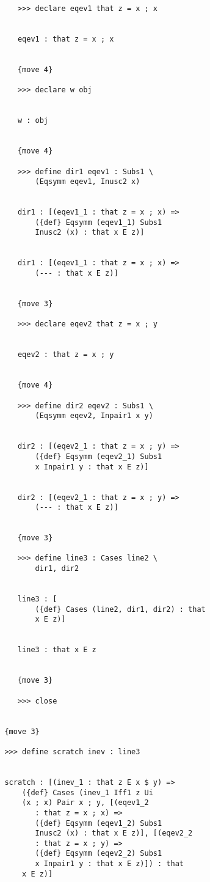 \documentclass[12pt]{article}
\begin{document}
\begin{verbatim}
            >>> declare eqev1 that z = x ; x


            eqev1 : that z = x ; x


            {move 4}

            >>> declare w obj


            w : obj


            {move 4}

            >>> define dir1 eqev1 : Subs1 \
                (Eqsymm eqev1, Inusc2 x)


            dir1 : [(eqev1_1 : that z = x ; x) => 
                ({def} Eqsymm (eqev1_1) Subs1 
                Inusc2 (x) : that x E z)]


            dir1 : [(eqev1_1 : that z = x ; x) => 
                (--- : that x E z)]


            {move 3}

            >>> declare eqev2 that z = x ; y


            eqev2 : that z = x ; y


            {move 4}

            >>> define dir2 eqev2 : Subs1 \
                (Eqsymm eqev2, Inpair1 x y)


            dir2 : [(eqev2_1 : that z = x ; y) => 
                ({def} Eqsymm (eqev2_1) Subs1 
                x Inpair1 y : that x E z)]


            dir2 : [(eqev2_1 : that z = x ; y) => 
                (--- : that x E z)]


            {move 3}

            >>> define line3 : Cases line2 \
                dir1, dir2


            line3 : [
                ({def} Cases (line2, dir1, dir2) : that 
                x E z)]


            line3 : that x E z


            {move 3}

            >>> close


         {move 3}

         >>> define scratch inev : line3


         scratch : [(inev_1 : that z E x $ y) => 
             ({def} Cases (inev_1 Iff1 z Ui 
             (x ; x) Pair x ; y, [(eqev1_2 
                : that z = x ; x) => 
                ({def} Eqsymm (eqev1_2) Subs1 
                Inusc2 (x) : that x E z)], [(eqev2_2 
                : that z = x ; y) => 
                ({def} Eqsymm (eqev2_2) Subs1 
                x Inpair1 y : that x E z)]) : that 
             x E z)]



\end{verbatim}
\end{document}
